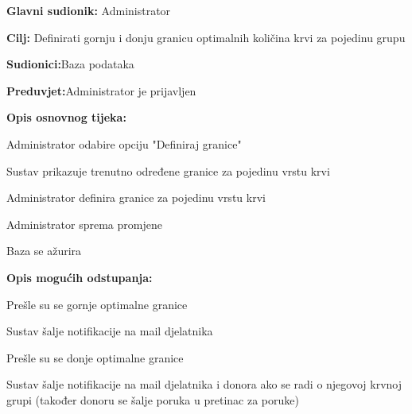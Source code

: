 \begin{packed_item}
	
	\item \textbf{Glavni sudionik: }{Administrator}
	\item  \textbf{Cilj:} {Definirati gornju i donju granicu optimalnih količina krvi za pojedinu grupu}
	\item  \textbf{Sudionici:}{Baza podataka}
	\item  \textbf{Preduvjet:}{Administrator je prijavljen}
	\item  \textbf{Opis osnovnog tijeka:}
	
	\item[] \begin{packed_enum}
		
		\item {Administrator odabire opciju "Definiraj granice"}
		\item {Sustav prikazuje trenutno određene granice za pojedinu vrstu krvi} 
		\item {Administrator definira granice za pojedinu vrstu krvi}
		\item {Administrator sprema promjene}
		\item {Baza se ažurira}
		\end{packed_enum}
	\item  \textbf{Opis mogućih odstupanja:}
	
		\item[] \begin{packed_item}
		
			\item[4.b] {Prešle su se gornje optimalne granice}	
				\item[] \begin{packed_enum}
			
				\item Sustav šalje notifikacije na mail djelatnika			
				\end{packed_enum}
			\item[4.c] {Prešle su se donje optimalne granice}	
				\item[] \begin{packed_enum}
			
				\item Sustav šalje notifikacije na mail djelatnika i donora ako se radi o njegovoj krvnoj grupi (također donoru se šalje poruka u pretinac za poruke)
				\end{packed_enum}
		
		
			\end{packed_item}
\end{packed_item}

